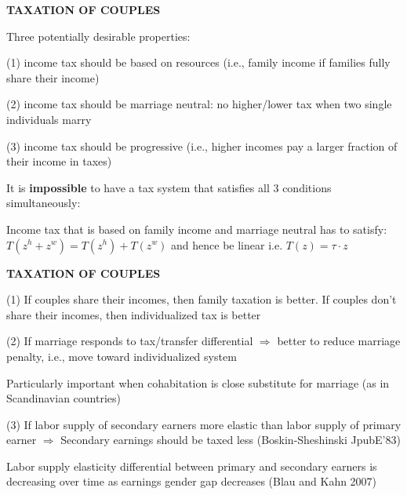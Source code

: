 \documentclass[landscape]{slides}
\begin{document}
\begin{slide}
\begin{center}
{\bf TAXATION OF COUPLES}
\end{center}
Three potentially desirable properties:

(1) income tax should be based on resources (i.e., family income if
families fully share their income)

(2) income tax should be marriage neutral: no higher/lower tax when two
single individuals marry

(3) income tax should be progressive (i.e., higher incomes pay a larger
fraction of their income in taxes)

It is \textbf{impossible} to have a tax system that satisfies all 3 conditions simultaneously:

Income tax that is based on family income and marriage neutral has to satisfy:
$T(z^h+z^w)=T(z^h)+T(z^w)$ and hence be linear i.e. $T(z)=\tau\cdot z$

\end{slide}

\begin{slide}
\begin{center}
{\bf TAXATION OF COUPLES}
\end{center}
(1) If couples share their incomes, then family taxation is better. 
If couples don't share their incomes, then individualized tax is better 

(2) If marriage responds to tax/transfer differential $\Rightarrow$
better to reduce marriage penalty, i.e., move toward
individualized system

Particularly important when cohabitation is close
substitute for marriage (as in Scandinavian countries)

(3) If labor supply of secondary earners more elastic than labor
supply of primary earner $\Rightarrow$ Secondary earnings should
be taxed less (Boskin-Sheshinski JpubE'83)

Labor supply elasticity differential between primary and secondary earners is decreasing over time as earnings
gender gap decreases (Blau and Kahn 2007)

\end{slide}
\end{document}
